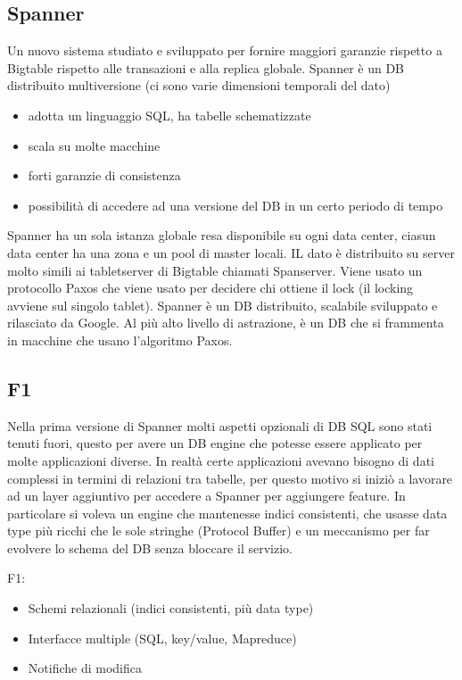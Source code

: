 \documentclass[12pt,italian]{report}
\begin{document}
\subsection{Spanner}
 Un nuovo sistema studiato e sviluppato per fornire maggiori garanzie rispetto a Bigtable rispetto alle transazioni e alla replica globale. Spanner è un DB distribuito multiversione (ci sono varie dimensioni temporali del dato)
 \begin{itemize}
     \item adotta un linguaggio SQL, ha tabelle schematizzate
     \item scala su molte macchine
     \item forti garanzie di consistenza
     \item possibilità di accedere ad una versione del DB in un certo periodo di tempo
 \end{itemize}
Spanner ha un sola istanza globale resa disponibile su ogni data center, ciasun data center ha una zona e un pool di master locali. IL dato è distribuito su server molto simili ai tabletserver di Bigtable chiamati Spanserver. Viene usato un protocollo Paxos che viene usato per decidere chi ottiene il lock (il locking avviene sul singolo tablet). 
\bigbreak
Spanner è un DB distribuito, scalabile sviluppato e rilasciato da Google. Al più alto livello di astrazione, è un DB che si frammenta in macchine che usano l'algoritmo Paxos. 
\subsection{F1}
Nella prima versione di Spanner molti aspetti opzionali di DB SQL sono stati tenuti fuori, questo per avere un DB engine che potesse essere applicato per molte applicazioni diverse. In realtà certe applicazioni avevano bisogno di dati complessi in termini di relazioni tra tabelle, per questo motivo si iniziò a lavorare ad un layer aggiuntivo per accedere a Spanner per aggiungere feature. In particolare si voleva un engine che mantenesse indici consistenti, che usasse data type più ricchi che le sole stringhe (Protocol Buffer) e un meccanismo per far evolvere lo schema del DB senza bloccare il servizio. 

\noindent F1:
\begin{itemize}
    \item Schemi relazionali (indici consistenti, più data type)
    \item Interfacce multiple (SQL, key/value, Mapreduce)
    \item Notifiche di modifica
\end{itemize}
\end{document}
